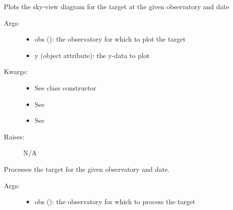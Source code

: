 \documentclass[letterpaper,10pt,english]{sphinxmanual}
\begin{document}
\begin{fulllineitems}
\begin{fulllineitems}
\end{fulllineitems}


\begin{fulllineitems}
\label{astroobs:astroobs.Target.polar}
Plots the sky-view diagram for the target at the given observatory and date
\begin{description}
\item[{Args:}] \leavevmode\begin{itemize}
\item {} 
obs (): the observatory for which to plot the target

\item {} 
y (object attribute): the y-data to plot

\end{itemize}

\item[{Kwargs:}] \leavevmode\begin{itemize}
\item {} 
See class constructor

\item {} 
See 

\item {} 
See 

\end{itemize}

\item[{Raises:}] \leavevmode
N/A

\end{description}

\end{fulllineitems}


\begin{fulllineitems}
\label{astroobs:astroobs.Target.process}
Processes the target for the given observatory and date.
\begin{description}
\item[{Args:}] \leavevmode\begin{itemize}
\item {} 
obs (): the observatory for which to process the target

\end{itemize}


\end{description}
\end{fulllineitems}
\end{fulllineitems}
\end{document}
